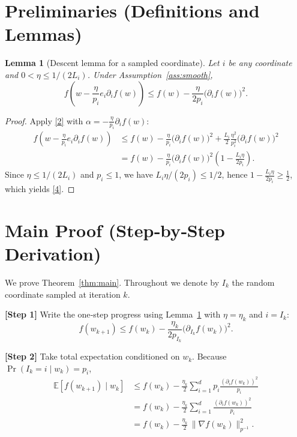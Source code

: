 \documentclass{article}
\newcommand{\E}{\mathbb{E}}
\newtheorem{lemma}{Lemma}
\begin{document}
\section*{Preliminaries (Definitions and Lemmas)}
\begin{lemma}[Descent lemma for a sampled coordinate]\label{lem:descent}
Let $i$ be any coordinate and $0<\eta\le 1/(2L_{i})$.  Under
Assumption~\ref{ass:smooth},
\[
f\!\left(w-\frac{\eta}{p_{i}}e_{i}\partial_{i}f(w)\right)
\le f(w)-\frac{\eta}{2p_{i}}\bigl(\partial_{i}f(w)\bigr)^{2}.
\tag{4}
\]
\end{lemma}
\begin{proof}
Apply \eqref{2} with $\alpha=-\frac{\eta}{p_{i}}\partial_{i}f(w)$:
\[
\begin{aligned}
f\!\left(w-\frac{\eta}{p_{i}}e_{i}\partial_{i}f(w)\right)
&\le f(w)-\frac{\eta}{p_{i}}\bigl(\partial_{i}f(w)\bigr)^{2}
   +\frac{L_{i}}{2}\frac{\eta^{2}}{p_{i}^{2}}\bigl(\partial_{i}f(w)\bigr)^{2}\\[4pt]
&= f(w)-\frac{\eta}{p_{i}}\bigl(\partial_{i}f(w)\bigr)^{2}
   \left(1-\frac{L_{i}\eta}{2p_{i}}\right).
\end{aligned}
\]
Since $\eta\le 1/(2L_{i})$ and $p_{i}\le1$, we have $L_{i}\eta/(2p_{i})\le 1/2$,
hence $1-\frac{L_{i}\eta}{2p_{i}}\ge\frac12$, which yields \eqref{4}.
\end{proof}

\section*{Main Proof (Step‑by‑Step Derivation)}
We prove Theorem~\ref{thm:main}.  Throughout we denote by $I_{k}$ the random
coordinate sampled at iteration $k$.

\bigskip
\noindent\textbf{[Step 1]}  Write the one‑step progress using Lemma~\ref{lem:descent} with $\eta=\eta_{k}$ and $i=I_{k}$:
\[
f(w_{k+1})\le f(w_{k})-
\frac{\eta_{k}}{2p_{I_{k}}}\bigl(\partial_{I_{k}}f(w_{k})\bigr)^{2}.
\tag{5}
\]

\noindent\textbf{[Step 2]}  Take total expectation conditioned on $w_{k}$.
Because $\Pr(I_{k}=i\mid w_{k})=p_{i}$,
\[
\begin{aligned}
\E\!\left[f(w_{k+1})\mid w_{k}\right]
&\le f(w_{k})-
\frac{\eta_{k}}{2}\sum_{i=1}^{d}p_{i}\frac{(\partial_{i}f(w_{k}))^{2}}{p_{i}}\\[4pt]
&= f(w_{k})-
\frac{\eta_{k}}{2}\sum_{i=1}^{d}\frac{(\partial_{i}f(w_{k}))^{2}}{p_{i}}\\[4pt]
&= f(w_{k})-\frac{\eta_{k}}{2}\,\|\nabla f(w_{k})\|_{p^{-1}}^{2}.
\end{aligned}
\tag{6}
\]
\end{document}
